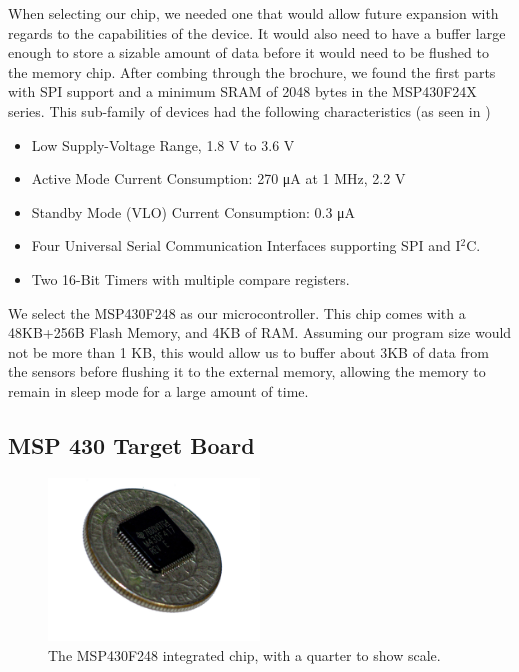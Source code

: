 When selecting our chip, we needed one that would allow future expansion with regards to the capabilities of the device. It would also need to have a buffer large enough to store a sizable amount of data before it would need to be flushed to the memory chip. After combing through the brochure, we found the first parts with SPI support and a minimum SRAM of 2048 bytes in the MSP430F24X series. This sub-family of devices had the following characteristics (as seen in \cite{msp430F24xfamily})

\begin{itemize}
	\item Low Supply-Voltage Range, 1.8 V to 3.6 V
	\item Active Mode Current Consumption: 270 μA at 1 MHz, 2.2 V
	\item Standby Mode (VLO) Current Consumption: 0.3 μA
	\item Four Universal Serial Communication Interfaces supporting SPI and I$^2$C.
	\item Two 16-Bit Timers with multiple compare registers.
\end{itemize}

We select the MSP430F248 as our microcontroller. This chip comes with a 48KB+256B Flash Memory, and 4KB of RAM. Assuming our program size would not be more than 1 KB, this would allow us to buffer about 3KB of data from the sensors before flushing it to the external memory, allowing the memory to remain in sleep mode for a large amount of time.

\subsection{MSP 430 Target Board}
\label{MSP430Target}

\begin{figure}
\begin{center}
\includegraphics[width=0.5\textwidth]{images/QFPFoot.jpg}
\caption{The MSP430F248 integrated chip, with a quarter to show scale.}
\label{Fig:QFPFoot}
\end{center}
\end{figure}

